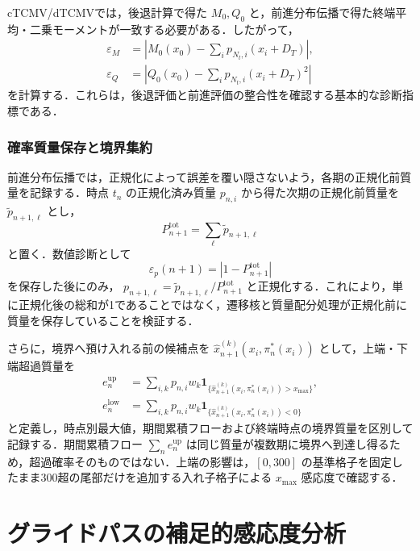 \documentclass[10pt,a4paper]{article}
\theoremstyle{plain}
\theoremstyle{definition}
\newcommand{\one}{\mathbf{1}}
\begin{document}
cTCMV/dTCMVでは，後退計算で得た $M_0,Q_0$ と，前進分布伝播で得た終端平均・二乗モーメントが一致する必要がある．したがって，
\begin{align}
  \varepsilon_M&=
  \left|M_0(x_0)-\sum_i p_{N_t,i}(x_i+D_T)\right|,
  \label{eq:eps-M}\\
  \varepsilon_Q&=
  \left|Q_0(x_0)-\sum_i p_{N_t,i}(x_i+D_T)^2\right|
  \label{eq:eps-Q}
\end{align}
を計算する．これらは，後退評価と前進評価の整合性を確認する基本的な診断指標である．

\subsubsection{確率質量保存と境界集約}

前進分布伝播では，正規化によって誤差を覆い隠さないよう，各期の正規化前質量を記録する．時点 $t_n$ の正規化済み質量 $p_{n,i}$ から得た次期の正規化前質量を $\widetilde p_{n+1,\ell}$ とし，
\begin{equation}
  P_{n+1}^{\mathrm{tot}}=\sum_{\ell}\widetilde p_{n+1,\ell}
  \label{eq:mass-total}
\end{equation}
と置く．数値診断として
\begin{equation}
  \varepsilon_p(n+1)=\left|1-P_{n+1}^{\mathrm{tot}}\right|
  \label{eq:mass-error}
\end{equation}
を保存した後にのみ， $p_{n+1,\ell}=\widetilde p_{n+1,\ell}/P_{n+1}^{\mathrm{tot}}$ と正規化する．これにより，単に正規化後の総和が1であることではなく，遷移核と質量配分処理が正規化前に質量を保存していることを検証する．

さらに，境界へ預け入れる前の候補点を $\widehat{x}_{n+1}^{(k)}(x_i,\pi_n^*(x_i))$ として，上端・下端超過質量を
\begin{align}
  e_n^{\mathrm{up}}
  &=\sum_{i,k}p_{n,i}w_k\one_{\{\widehat{x}_{n+1}^{(k)}(x_i,\pi_n^*(x_i))>x_{\max}\}},\\
  e_n^{\mathrm{low}}
  &=\sum_{i,k}p_{n,i}w_k\one_{\{\widehat{x}_{n+1}^{(k)}(x_i,\pi_n^*(x_i))<0\}}
  \label{eq:boundary-excursion}
\end{align}
と定義し，時点別最大値，期間累積フローおよび終端時点の境界質量を区別して記録する．期間累積フロー $\sum_n e_n^{\mathrm{up}}$ は同じ質量が複数期に境界へ到達し得るため，超過確率そのものではない．上端の影響は，$[0,300]$ の基準格子を固定したまま300超の尾部だけを追加する入れ子格子による $x_{\max}$ 感応度で確認する．


\section{グライドパスの補足的感応度分析}
\label{sec:strict-clip-results}
\end{document}

